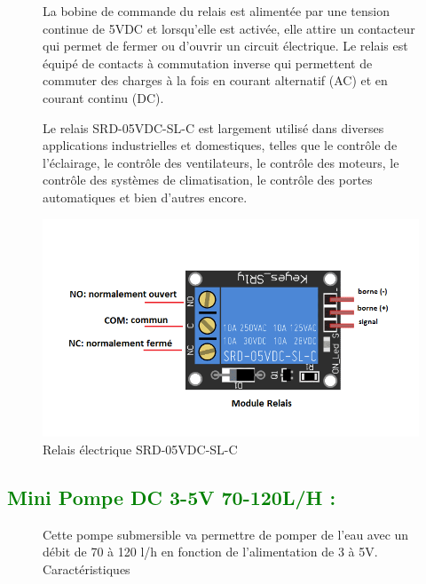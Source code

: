 \begin{flushleft}
\begin{figure}[h]
\begin{minipage}{0.6\textwidth}
				La bobine de commande du relais est alimentée par une tension continue de 5VDC et lorsqu'elle est activée, elle attire un contacteur qui permet de fermer ou d'ouvrir un circuit électrique. Le relais est équipé de contacts à commutation inverse qui permettent de commuter des charges à la fois en courant alternatif (AC) et en courant continu (DC).
				
				Le relais SRD-05VDC-SL-C est largement utilisé dans diverses applications industrielles et domestiques, telles que le contrôle de l'éclairage, le contrôle des ventilateurs, le contrôle des moteurs, le contrôle des systèmes de climatisation, le contrôle des portes automatiques et bien d'autres encore.
				
			\end{minipage}
			\begin{minipage}{0.4\textwidth}
				\centering
				\includegraphics[width=\textwidth]{chapitres/images/relai-2-1.png}
				\caption{Relais électrique SRD-05VDC-SL-C}
				\label{fig:votre_image}
			\end{minipage}
		\end{figure}
	\subsection{\textcolor{green}{Mini Pompe DC 3-5V 70-120L/H :}}
		\begin{figure}[h]
			\begin{minipage}{0.6\textwidth}
				Cette pompe submersible va permettre de pomper de l’eau avec un débit de 70 à 120 l/h en fonction de l’alimentation de 3 à 5V.
				Caractéristiques
				

\end{minipage}
\end{figure}
\end{flushleft}
